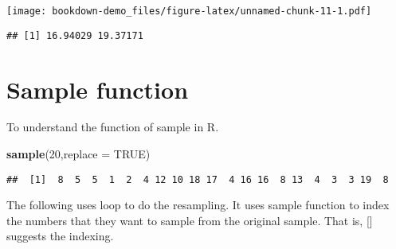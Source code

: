 \documentclass[]{book}
\newenvironment{Shaded}{\begin{snugshade}}{\end{snugshade}}
\newcommand{\ControlFlowTok}[1]{\textcolor[rgb]{0.13,0.29,0.53}{\textbf{#1}}}
\newcommand{\DataTypeTok}[1]{\textcolor[rgb]{0.13,0.29,0.53}{#1}}
\newcommand{\DecValTok}[1]{\textcolor[rgb]{0.00,0.00,0.81}{#1}}
\newcommand{\KeywordTok}[1]{\textcolor[rgb]{0.13,0.29,0.53}{\textbf{#1}}}
\newcommand{\NormalTok}[1]{#1}
\newcommand{\OperatorTok}[1]{\textcolor[rgb]{0.81,0.36,0.00}{\textbf{#1}}}
\newcommand{\OtherTok}[1]{\textcolor[rgb]{0.56,0.35,0.01}{#1}}
\newcommand{\StringTok}[1]{\textcolor[rgb]{0.31,0.60,0.02}{#1}}
\begin{document}
\texttt{[image: bookdown-demo\_files/figure-latex/unnamed-chunk-11-1.pdf]}

\begin{verbatim}
## [1] 16.94029 19.37171
\end{verbatim}

\hypertarget{sample-function}{%
\section{Sample function}\label{sample-function}}

To understand the function of sample in R.

\begin{Shaded}
\begin{Highlighting}[]
\KeywordTok{sample}\NormalTok{(}\DecValTok{20}\NormalTok{,}\DataTypeTok{replace =} \OtherTok{TRUE}\NormalTok{)}
\end{Highlighting}
\end{Shaded}

\begin{verbatim}
##  [1]  8  5  5  1  2  4 12 10 18 17  4 16 16  8 13  4  3  3 19  8
\end{verbatim}

The following uses loop to do the resampling. It uses sample function to index the numbers that they want to sample from the original sample. That is, {[}{]} suggests the indexing.

\begin{Shaded}
\end{Shaded}
\end{document}
